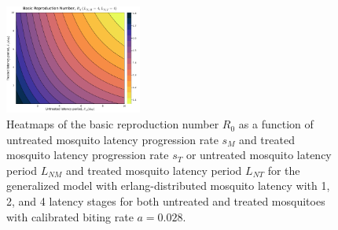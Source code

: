 \documentclass[11pt]{article}
\begin{document}
\begin{figure}[H]
  \includegraphics[width=0.4\textwidth]{../../fig/R0_periods_SMxST_4x4_cal.pdf}
  \caption{Heatmaps of the basic reproduction number $R_0$ as a function of untreated mosquito latency progression rate $s_M$ and treated mosquito latency progression rate $s_T$ or untreated mosquito latency period $L_{NM}$ and treated mosquito latency period $L_{NT}$ for the generalized model with erlang-distributed mosquito latency with 1, 2, and 4 latency stages for both untreated and treated mosquitoes with calibrated biting rate $a=0.028$.}
\end{figure}
\end{document}
